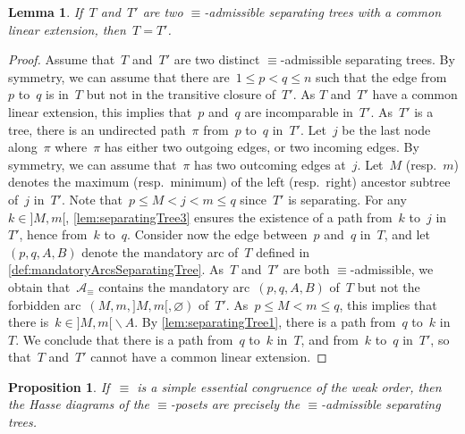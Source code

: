 \documentclass{amsart}
\newtheorem{proposition}[theorem]{Proposition}
\newtheorem{lemma}[theorem]{Lemma}
\theoremstyle{definition}
\newcommand{\ssm}{\smallsetminus} %
\newcommand{\arcs}{{\mathcal{A}}} %
\begin{document}
\begin{lemma}
\label{lem:admissibleSeparatingTreesWithCommonLinearExtensions}
If~$T$ and~$T'$ are two $\equiv$-admissible separating trees with a common linear extension, then~${T = T'}$.
\end{lemma}

\begin{proof}
Assume that~$T$ and~$T'$ are two distinct $\equiv$-admissible separating trees. 
By symmetry, we can assume that there are~$1 \le p < q \le n$ such that the edge from~$p$ to~$q$ is in~$T$ but not in the transitive closure of~$T'$.
As $T$ and~$T'$ have a common linear extension, this implies that~$p$ and~$q$ are incomparable in~$T'$.
As~$T'$ is a tree, there is an undirected path~$\pi$ from~$p$ to~$q$ in~$T'$.
Let~$j$ be the last node along~$\pi$ where~$\pi$ has either two outgoing edges, or two incoming edges.
By symmetry, we can assume that~$\pi$ has two outcoming edges at~$j$.
Let~$M$ (resp.~$m$) denotes the maximum (resp.~minimum) of the left (resp.~right) ancestor subtree of~$j$ in~$T'$.
Note that~$p \le M < j < m \le q$ since~$T'$ is separating.
For any~$k \in {]M,m[}$, \cref{lem:separatingTree3} ensures the existence of a path from~$k$ to~$j$ in~$T'$, hence from~$k$ to~$q$.
Consider now the edge between~$p$ and~$q$ in~$T$, and let~$(p, q, A, B)$ denote the mandatory arc of~$T$ defined in \cref{def:mandatoryArcsSeparatingTree}.
As~$T$ and~$T'$ are both $\equiv$-admissible, we obtain that~$\arcs_\equiv$ contains the mandatory arc~$(p, q, A, B)$ of~$T$ but not the forbidden arc~$(M, m, {]M,m[}, \varnothing)$ of~$T'$.
As~$p \le M < m \le q$, this implies that there is~$k \in {]M,m[} \ssm A$.
By \cref{lem:separatingTree1}, there is a path from~$q$ to~$k$ in~$T$.
We conclude that there is a path from~$q$ to~$k$ in~$T$, and from~$k$ to~$q$ in~$T'$, so that~$T$ and~$T'$ cannot have a common linear extension.
\end{proof}

\begin{proposition}
\label{prop:admissibleSeparatingTrees}
If~$\equiv$ is a simple essential congruence of the weak order, then the Hasse diagrams of the $\equiv$-posets are precisely the $\equiv$-admissible separating trees.
\end{proposition}
\end{document}
